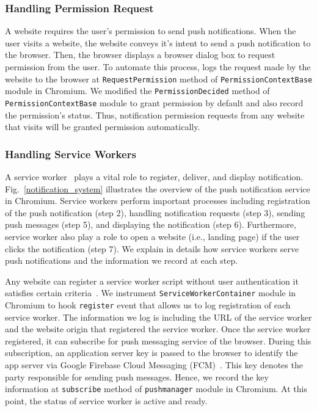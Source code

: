 \subsubsection{Handling Permission Request}
A website requires the user's permission to send push notifications. When the user visits a website, the website conveys it's intent to send a push notification to the browser. Then, the browser displays a browser dialog box to request permission from the user. To automate this process, \sysname logs the request made by the website to the browser at \texttt{RequestPermission} method of \texttt{PermissionContextBase} module in Chromium. %
We modified the \texttt{PermissionDecided} method of \texttt{PermissionContextBase} module to grant permission by default and also record the permission's status. Thus, notification permission requests from any website that \sysname visits will be granted permission automatically.


\subsubsection{Handling Service Workers}
A service worker~\cite{chrome_service_worker} plays a vital role to register, deliver, and display notification. Fig.~\ref{notification_system} illustrates the overview of the push notification service in Chromium. Service workers perform important processes including registration of the push notification (step 2), handling notification requests (step 3), sending push messages (step 5), and displaying the notification (step 6). Furthermore, service worker also play a role to open a website (i.e., landing page) if the user clicks the notification (step 7). We explain in details how service workers serve push notifications and the information we record at each step.

\textbf{}
Any website can register a service worker script without user authentication it satisfies certain criteria~\cite{chrome_serviceworker}. We instrument \texttt{ServiceWorkerContainer} module in Chromium to hook \texttt{register} event that allows us to log registration of each service worker. The information we log is including the URL of the service worker and the website origin that registered the service worker. Once the service worker registered, it can subscribe for push messaging service of the browser. During this subscription, an application server key is passed to the browser to identify the app server via Google Firebase Cloud Messaging (FCM)~\cite{google_fcm}. This key denotes the party responsible for sending push messages. Hence, we record the key information at \texttt{subscribe} method of \texttt{pushmanager} module in Chromium.  At this point, the status of service worker is active and ready.

